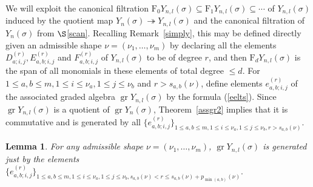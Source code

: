 \documentclass[twoside,12pt,reqno]{amsart}
\newtheorem{Lemma}[Proposition]{Lemma}
\def\F{\mathrm{F}}
\def\gr{\operatorname{gr}}
\begin{document}
We will exploit the canonical filtration
$\F_0 Y_{n,l}(\sigma) \subseteq
\F_1 Y_{n,l}(\sigma) \subseteq \cdots$
of $Y_{n,l}(\sigma)$ 
induced by the quotient map
$Y_{n}(\sigma) \twoheadrightarrow Y_{n,l}(\sigma)$
and the canonical filtration of $Y_n(\sigma)$
from $\S$\ref{scan}.
Recalling Remark~\ref{simply},
this may be defined directly
given an admissible shape $\nu = (\nu_1,\dots,\nu_m)$ by
declaring all the elements
$D_{a;i,j}^{(r)}, E_{a,b;i,j}^{(r)}$
and $F_{a,b;i,j}^{(r)}$ of $Y_{n,l}(\sigma)$
to be of degree $r$, and then 
$\F_d Y_{n,l}(\sigma)$ is the span of all monomials
in these elements of total degree $\leq d$.
For $1 \leq a,b \leq m, 1 \leq i \leq \nu_a, 1 \leq j \leq \nu_b$
and $r > s_{a,b}(\nu)$, define elements
$e_{a,b;i,j}^{(r)}$ of the associated graded algebra
$\gr Y_{n,l}(\sigma)$
by the formula (\ref{eelts}).
Since $\gr Y_{n,l}(\sigma)$ is a quotient of 
$\gr Y_n(\sigma)$, Theorem~\ref{assgr2} implies that 
it is commutative and
is generated by all
$\{e_{a,b;i,j}^{(r)}\}_{1 \leq a,b \leq m, 
1 \leq i \leq \nu_a, 1 \leq j \leq \nu_b, r >s_{a,b}(\nu)}$.

\begin{Lemma}\label{yak}
For any admissible shape $\nu = (\nu_1,\dots,\nu_m)$, 
$\gr Y_{n,l}(\sigma)$
is generated just by the elements
$\{e_{a,b;i,j}^{(r)}\}_{1 \leq a,b \leq m, 
1 \leq i \leq \nu_a, 1 \leq j \leq \nu_b, s_{a,b}(\nu) <
r \leq s_{a,b}(\nu) + 
p_{\min(a,b)}(\nu)}.$
\end{Lemma}
\end{document}
